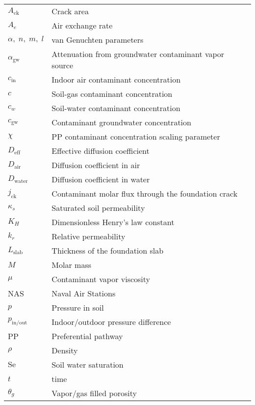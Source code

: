 \documentclass[preprint,12pt]{elsarticle}
\begin{document}
\clearpage
\begin{table}[htb!]
  \centering
  \begin{tabular}{l l}
    \toprule
    $A_\mathrm{ck}$ & Crack area \\
    $A_e$ & Air exchange rate \\
    $\alpha, \; n, \; m, \; l$ & van Genuchten parameters \\
    $\alpha_\mathrm{gw}$ & Attenuation from groundwater contaminant vapor source \\
    $c_\mathrm{in}$ & Indoor air contaminant concentration \\
    $c$ & Soil-gas contaminant concentration \\
    $c_w$ & Soil-water contaminant concentration \\
    $c_\mathrm{gw}$ & Contaminant groundwater concentration \\
    $\chi$ & PP contaminant concentration scaling parameter \\
    $D_\mathrm{eff}$ & Effective diffusion coefficient \\
    $D_\mathrm{air}$ & Diffusion coefficient in air \\
    $D_\mathrm{water}$ & Diffusion coefficient in water \\
    $j_\mathrm{ck}$ & Contaminant molar flux through the foundation crack \\
    $\kappa_s$ & Saturated soil permeability \\
    $K_H$ & Dimensionless Henry's law constant \\
    $k_r$ & Relative permeability \\
    $L_\mathrm{slab}$ & Thickness of the foundation slab \\
    $M$ & Molar mass \\
    $\mu$ & Contaminant vapor viscosity \\
    NAS & Naval Air Stations \\
    $p$ & Pressure in soil \\
    $p_\mathrm{in/out}$ & Indoor/outdoor pressure difference \\
    PP & Preferential pathway \\
    $\rho$ & Density \\
    $\mathrm{Se}$ & Soil water saturation \\
    $t$ & time \\
    $\theta_g$ & Vapor/gas filled porosity \\

\end{tabular}
\end{table}
\end{document}
